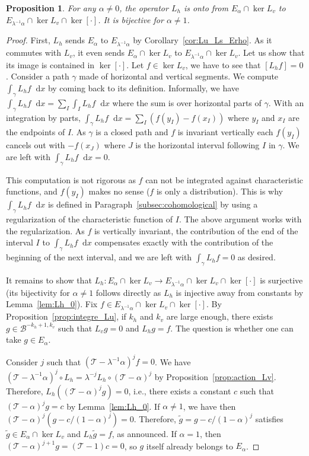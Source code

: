 \documentclass[11pt, a4paper, oneside, final, pagebackref]{amsart}
\newcommand{\boB}{\mathcal{B}}
\newcommand{\boT}{\mathcal{T}}
\newcommand{\dd}{\mathop{}\!\mathrm{d}}
\newtheorem{prop}[thm]{Proposition}
\theoremstyle{definition}
\numberwithin{equation}{section}
\begin{document}
\begin{prop}
\label{prop:L_h_surj} For any $\alpha \neq 0$, the operator $L_h$ is onto
from $E_\alpha \cap \ker L_v$ to $E_{\lambda^{-1}\alpha} \cap \ker L_v \cap
\ker [\cdot]$. It is bijective for $\alpha \neq 1$.
\end{prop}
\begin{proof}
First, $L_h$ sends $E_\alpha$ to $E_{\lambda^{-1}\alpha}$ by
Corollary~\ref{cor:Lu_Ls_Erho}. As it commutes with $L_v$, it even sends
$E_\alpha \cap \ker L_v$ to $E_{\lambda^{-1}\alpha} \cap \ker L_v$. Let us
show that its image is contained in $\ker [\cdot]$. Let $f \in \ker L_v$, we
have to see that $[L_h f] = 0$. Consider a path $\gamma$ made of horizontal
and vertical segments. We compute $\int_\gamma L_h f \dd x$ by coming back to
its definition. Informally, we have $\int_\gamma L_h f \dd x = \sum_I \int_I
L_h f \dd x$ where the sum is over horizontal parts of $\gamma$. With an
integration by parts, $\int_\gamma L_h f \dd x = \sum_I (f(y_I) - f(x_I))$
where $y_I$ and $x_I$ are the endpoints of $I$. As $\gamma$ is a closed path
and $f$ is invariant vertically each $f(y_I)$ cancels out with $-f(x_J)$
where $J$ is the horizontal interval following $I$ in $\gamma$. We are left
with $\int_\gamma L_h f \dd x = 0$.

This computation is not rigorous as $f$ can not be integrated against
characteristic functions, and $f(y_I)$ makes no sense ($f$ is only a
distribution). This is why $\int_\gamma L_h f \dd x$ is defined in
Paragraph~\ref{subsec:cohomological} by using a regularization of the
characteristic function of $I$. The above argument works with the
regularization. As $f$ is vertically invariant, the contribution of the end
of the interval $I$ to $\int_\gamma L_h f \dd x$ compensates exactly with the
contribution of the beginning of the next interval, and we are left with
$\int_\gamma L_h f = 0$ as desired.

It remains to show that $L_h : E_\alpha \cap \ker L_v \to
E_{\lambda^{-1}\alpha} \cap \ker L_v \cap \ker [\cdot]$ is surjective (its
bijectivity for $\alpha \neq 1$ follows directly as $L_h$ is injective away
from constants by Lemma~\ref{lem:Lh_0}). Fix $f \in E_{\lambda^{-1}\alpha}
\cap \ker L_v \cap \ker [\cdot]$. By Proposition~\ref{prop:integre_Lu}, if
$k_h$ and $k_v$ are large enough, there exists $g \in \boB^{-k_h+1, k_v}$
such that $L_v g = 0$ and $L_h g = f$. The question is whether one can take
$g \in E_\alpha$.

Consider $j$ such that $(\boT-\lambda^{-1}\alpha)^j f = 0$. We have
$(\boT-\lambda^{-1}\alpha)^j \circ L_h = \lambda^{-j} L_h  \circ
(\boT-\alpha)^j$ by Proposition~\ref{prop:action_Lv}. Therefore, $L_h(
(\boT-\alpha)^j g) = 0$, i.e., there exists a constant $c$ such that
$(\boT-\alpha)^j g = c$ by Lemma~\ref{lem:Lh_0}. If $\alpha \neq 1$, we have
then $(\boT-\alpha)^j (g - c/(1-\alpha)^j) = 0$. Therefore, $\tilde g = g -
c/(1-\alpha)^j$ satisfies $\tilde g \in E_\alpha \cap \ker L_v$ and $L_h
\tilde g = f$, as announced. If $\alpha = 1$, then $(\boT-\alpha)^{j+1} g =
(\boT - 1) c = 0$, so $g$ itself already belongs to $E_\alpha$.
\end{proof}
\end{document}
